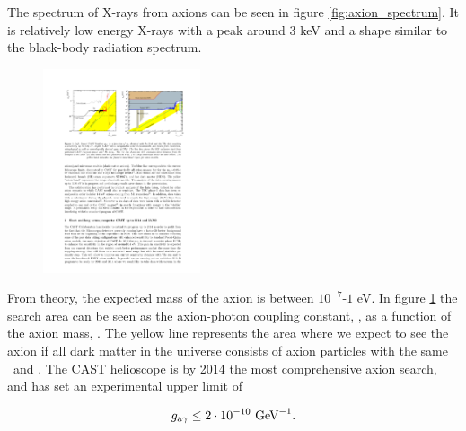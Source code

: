 The spectrum of X-rays from axions can be seen in figure \ref{fig:axion_spectrum}. It is relatively low energy X-rays with a peak around 3 keV and a shape similar to the black-body radiation spectrum.

\begin{figure}[htbp]
  \centering
    \includegraphics[height=6cm]{figures/cast/axion_search_cast.pdf}
  \caption{}
  \label{fig:axion_search_cast}
\end{figure}

From theory, the expected mass of the axion is between $10^{-7}$-$1$ eV. In figure \ref{fig:axion_search_cast} the search area can be seen as the axion-photon coupling constant, \gay, as a function of the axion mass, \maxion. The yellow line represents the area where we expect to see the axion if all dark matter in the universe consists of axion particles with the same \maxion\ and \gay. The CAST helioscope is by 2014 the most comprehensive axion search, and has set an experimental upper limit of

\begin{eqnarray}
g_{\textrm{a$\gamma$}} \leq 2 \cdot 10^{-10} \textrm{ GeV}^{-1}.
\end{eqnarray}



